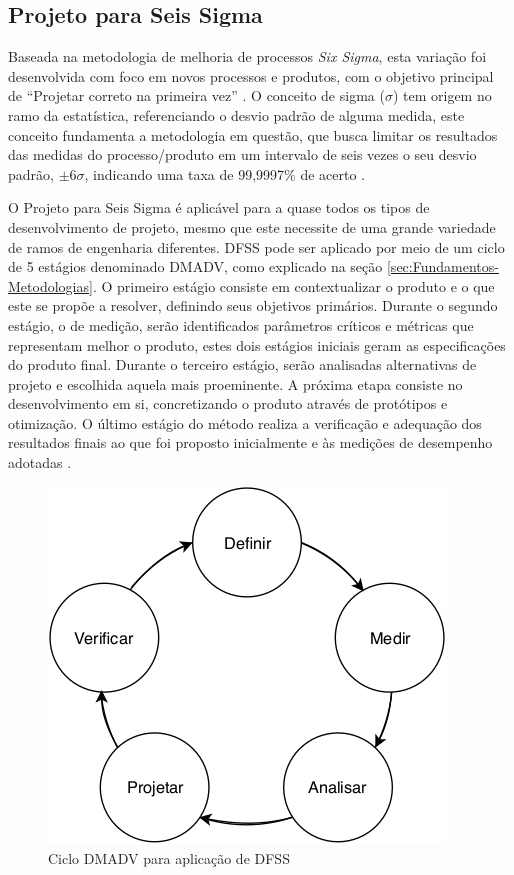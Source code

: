 

\subsection{Projeto para Seis Sigma}
Baseada na metodologia de melhoria de processos \textit{Six Sigma}, esta variação foi desenvolvida com foco em novos processos e produtos, com o objetivo principal
de ``Projetar correto na primeira vez'' \cite{yang2003design}. O conceito de sigma ($\sigma$) tem origem no ramo da estatística, referenciando o desvio padrão
de alguma medida, este conceito fundamenta a metodologia em questão, que busca limitar os resultados das medidas do processo/produto em um intervalo de seis 
vezes o seu desvio padrão, $\pm6\sigma$, indicando uma taxa de 99,9997$\%$ de acerto \cite{pande2001six}.

O Projeto para Seis Sigma é aplicável para a quase todos os tipos de desenvolvimento de projeto, mesmo que este necessite de uma grande variedade de ramos de 
engenharia diferentes. DFSS pode ser aplicado por meio de um ciclo de 5 estágios denominado DMADV, como explicado na seção \ref{sec:Fundamentos-Metodologias}.
O primeiro estágio consiste em contextualizar o produto e o que este se propõe a resolver, definindo seus objetivos primários. Durante o segundo estágio, 
o de medição, serão identificados parâmetros críticos e métricas que representam melhor o produto, estes dois estágios iniciais geram as especificações 
do produto final. Durante o terceiro estágio, serão analisadas alternativas de projeto e escolhida aquela mais proeminente. A próxima etapa consiste no desenvolvimento
em si, concretizando o produto através de protótipos e otimização. O último estágio do método realiza a verificação e adequação dos resultados finais ao que foi
proposto inicialmente e às medições de desempenho adotadas \cite{maass2009applying}.

\begin{figure}[h]
\caption{Ciclo DMADV para aplicação de DFSS}    
\begin{centering}
\includegraphics[width=0.5\columnwidth]{images/meth/DMADV.png}
\par\end{centering}

\label{fig:DMADV}
\end{figure}

